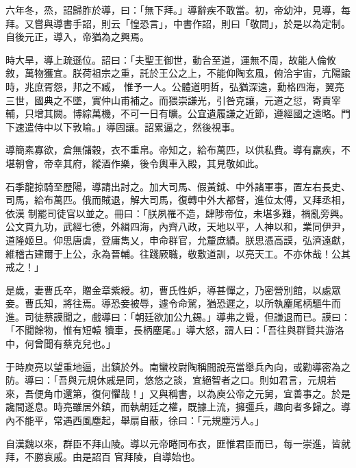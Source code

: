 \begin{pinyinscope}
 六年冬，烝，詔歸胙於導，曰：「無下拜。」導辭疾不敢當。初，帝幼沖，見導，每拜。又嘗與導書手詔，則云「惶恐言」，中書作詔，則曰「敬問」，於是以為定制。自後元正，導入，帝猶為之興焉。



 時大旱，導上疏遜位。詔曰：「夫聖王御世，動合至道，運無不周，故能人倫攸敘，萬物獲宜。朕荷祖宗之重，託於王公之上，不能仰陶玄風，俯洽宇宙，亢陽踰時，兆庶胥怨，邦之不臧，
 惟予一人。公體道明哲，弘猶深遠，勳格四海，翼亮三世，國典之不墜，實仲山甫補之。而猥崇謙光，引咎克讓，元道之愆，寄責宰輔，只增其闕。博綜萬機，不可一日有曠。公宜遺履謙之近節，遵經國之遠略。門下速遣侍中以下敦喻。」導固讓。詔累逼之，然後視事。



 導簡素寡欲，倉無儲穀，衣不重帛。帝知之，給布萬匹，以供私費。導有羸疾，不堪朝會，帝幸其府，縱酒作樂，後令輿車入殿，其見敬如此。



 石季龍掠騎至歷陽，導請出討之。加大司馬、假黃鉞、中外諸軍事，置左右長史、司馬，給布萬匹。俄而賊退，解大司馬，復轉中外大都督，進位太傅，又拜丞相，依漢
 制罷司徒官以並之。冊曰：「朕夙罹不造，肆陟帝位，未堪多難，禍亂旁興。公文貫九功，武經七德，外緝四海，內齊八政，天地以平，人神以和，業同伊尹，道隆姬旦。仰思唐虞，登庸雋乂，申命群官，允釐庶績。朕思憑高謨，弘濟遠獻，維稽古建爾于上公，永為晉輔。往踐厥職，敬敷道訓，以亮天工。不亦休哉！公其戒之！」



 是歲，妻曹氏卒，贈金章紫綬。初，曹氏性妒，導甚憚之，乃密營別館，以處眾妾。曹氏知，將往焉。導恐妾被辱，遽令命駕，猶恐遲之，以所執麈尾柄驅牛而進。司徒蔡謨聞之，戲導曰：「朝廷欲加公九錫。」導弗之覺，但謙退而已。謨曰：「不聞餘物，惟有短轅
 犢車，長柄麈尾。」導大怒，謂人曰：「吾往與群賢共游洛中，何曾聞有蔡克兒也。」



 于時庾亮以望重地逼，出鎮於外。南蠻校尉陶稱間說亮當舉兵內向，或勸導密為之防。導曰：「吾與元規休戚是同，悠悠之談，宜絕智者之口。則如君言，元規若來，吾便角巾還第，復何懼哉！」又與稱書，以為庾公帝之元舅，宜善事之。於是讒間遂息。時亮雖居外鎮，而執朝廷之權，既據上流，擁彊兵，趣向者多歸之。導內不能平，常遇西風塵起，舉扇自蔽，徐曰：「元規塵污人。」



 自漢魏以來，群臣不拜山陵。導以元帝睠同布衣，匪惟君臣而已，每一崇進，皆就拜，不勝哀戚。由是詔百
 官拜陵，自導始也。




\end{pinyinscope}
